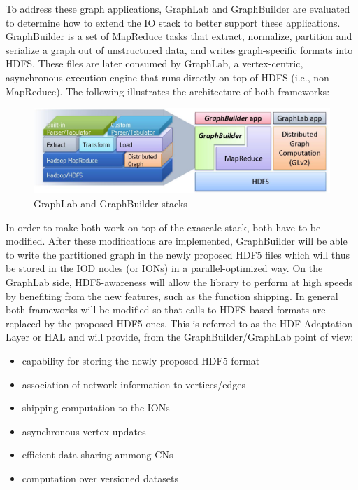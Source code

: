 \documentclass[conference]{IEEEtran}
\begin{document}
To address these graph applications, GraphLab and GraphBuilder are evaluated
to determine how to extend the IO stack to better support these applications.
GraphBuilder is a set of MapReduce tasks that extract, normalize, partition and
serialize a graph out of unstructured data, and writes graph-specific formats
into HDFS. These files are later consumed by GraphLab, a vertex-centric,
asynchronous execution engine that runs directly on top of HDFS (i.e.,
non-MapReduce). The following illustrates the architecture of both frameworks:

\begin{figure}[htbp]
\centering
\vspace{-0.10in}
\includegraphics[width=\columnwidth]{images/graphlab-and-graphbuilder.png}
\vspace{-0.30in}
\caption{GraphLab and GraphBuilder stacks}
\label{fig:graphlab-graphbuilder}
\vspace{-0.10in}
\end{figure}

In order to make both work on top of the exascale stack, both have to be
modified. After these modifications are implemented, GraphBuilder will
be able to write the partitioned graph in the newly proposed HDF5
files which will thus be stored in the IOD nodes (or IONs) in a
parallel-optimized way. On the GraphLab side, HDF5-awareness will allow
the library to perform at high speeds by benefiting from the new
features, such as the function shipping. In general both frameworks will be
modified so that calls to HDFS-based formats are replaced by the proposed HDF5
ones. This is referred to as the HDF Adaptation Layer or HAL and will
provide, from the GraphBuilder/GraphLab point of view:

\begin{itemize}
\itemsep1pt\parskip0pt
\item
  capability for storing the newly proposed HDF5 format
\item
  association of network information to vertices/edges
\item
  shipping computation to the IONs
\item
  asynchronous vertex updates
\item
  efficient data sharing ammong CNs
\item
  computation over versioned datasets
\end{itemize}
\end{document}

